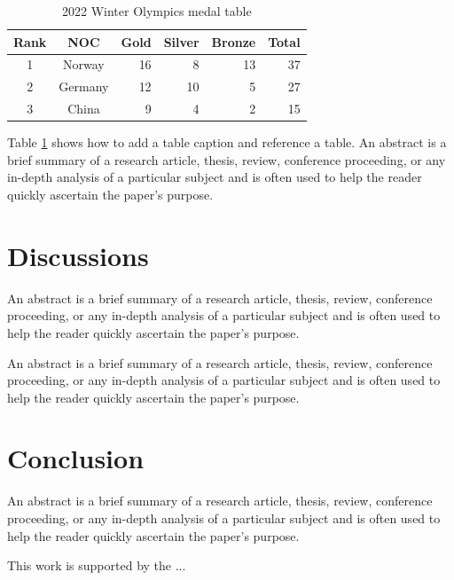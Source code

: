 \documentclass[a4paper,zihao=-4,fontset=ubuntu]{ctexart}
\begin{document}
   \begin{table}[htbp]
        \caption{2022 Winter Olympics medal table}
        \label{tab:data}
        \centering
        \begin{tabular}{ccrrrr}
            \toprule
            Rank & NOC & Gold & Silver & Bronze & Total \\ 
            \midrule
            1 & Norway & 16 & 8 & 13 & 37 \\
            2 & Germany & 12 & 10 & 5 & 27 \\
            3 & China & 9 & 4 & 2 & 15 \\
            \bottomrule
        \end{tabular}
    \end{table}

    Table \ref{tab:data} shows how to add a table caption and reference a table. An abstract is a brief summary of a research article, thesis, review, conference proceeding, or any in-depth analysis of a particular subject and is often used to help the reader quickly ascertain the paper's purpose.


    \section{Discussions}

    An abstract is a brief summary of a research article, thesis, review, conference proceeding, or any in-depth analysis of a particular subject and is often used to help the reader quickly ascertain the paper's purpose.

    An abstract is a brief summary of a research article, thesis, review, conference proceeding, or any in-depth analysis of a particular subject and is often used to help the reader quickly ascertain the paper's purpose.

    \section{Conclusion}

    An abstract is a brief summary of a research article, thesis, review, conference proceeding, or any in-depth analysis of a particular subject and is often used to help the reader quickly ascertain the paper's purpose.

    \begin{acknowledgements}
        This work is supported by the ...
    \end{acknowledgements}

    
    
    
\end{document}
